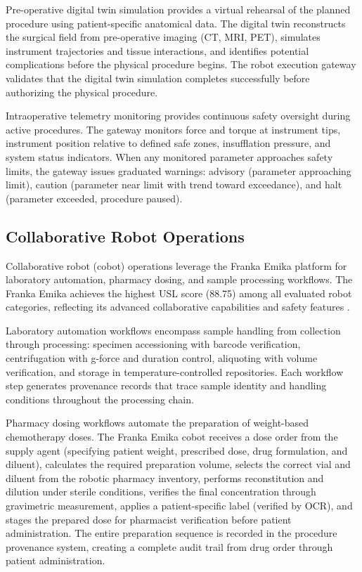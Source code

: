 Pre-operative digital twin simulation provides a virtual rehearsal of the planned
procedure using patient-specific anatomical data. The digital twin reconstructs the
surgical field from pre-operative imaging (CT, MRI, PET), simulates instrument
trajectories and tissue interactions, and identifies potential complications before
the physical procedure begins. The robot execution gateway validates that the
digital twin simulation completes successfully before authorizing the physical procedure.

Intraoperative telemetry monitoring provides continuous safety oversight during active
procedures. The gateway monitors force and torque at instrument tips, instrument position
relative to defined safe zones, insufflation pressure, and system status indicators. When
any monitored parameter approaches safety limits, the gateway issues graduated warnings:
advisory (parameter approaching limit), caution (parameter near limit with trend toward
exceedance), and halt (parameter exceeded, procedure paused).

\subsection{Collaborative Robot Operations}

Collaborative robot (cobot) operations leverage the Franka Emika platform for laboratory
automation, pharmacy dosing, and sample processing workflows. The Franka Emika achieves
the highest USL score (88.75) among all evaluated robot categories, reflecting its advanced
collaborative capabilities and safety features \cite{national-platform-paper}.

Laboratory automation workflows encompass sample handling from collection through
processing: specimen accessioning with barcode verification, centrifugation with
g-force and duration control, aliquoting with volume verification, and storage in
temperature-controlled repositories. Each workflow step generates provenance records
that trace sample identity and handling conditions throughout the processing chain.

Pharmacy dosing workflows automate the preparation of weight-based chemotherapy doses.
The Franka Emika cobot receives a dose order from the supply agent (specifying patient
weight, prescribed dose, drug formulation, and diluent), calculates the required
preparation volume, selects the correct vial and diluent from the robotic pharmacy
inventory, performs reconstitution and dilution under sterile conditions, verifies the
final concentration through gravimetric measurement, applies a patient-specific label
(verified by OCR), and stages the prepared dose for pharmacist verification before
patient administration. The entire preparation sequence is recorded in the procedure
provenance system, creating a complete audit trail from drug order through patient
administration.

